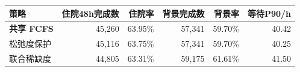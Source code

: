 \begin{tabular}{lrrrrr}
\toprule
策略 & 住院48h完成数 & 住院率 & 背景完成数 & 背景率 & 等待P90/h \\
\midrule
\textbf{共享 FCFS} & 45,260 & 63.95\% & 57,341 & 59.70\% & 40.42 \\
松弛度保护 & 45,116 & 63.75\% & 57,341 & 59.70\% & 40.25 \\
联合稀缺度 & 44,805 & 63.31\% & 59,175 & 61.61\% & 41.50 \\
\bottomrule
\end{tabular}
